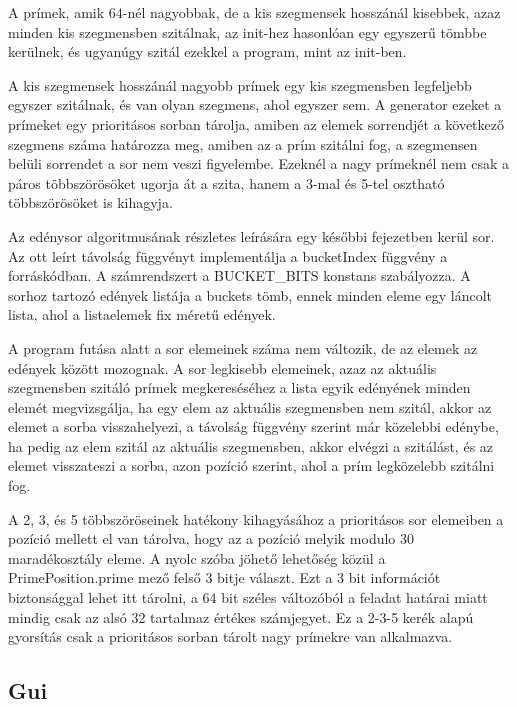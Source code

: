 A prímek, amik $64$-nél nagyobbak, de a kis szegmensek hosszánál kisebbek, azaz minden kis szegmensben szitálnak, az init-hez hasonlóan egy egyszerű tömbbe kerülnek, és ugyanúgy szitál ezekkel a program, mint az init-ben.

A kis szegmensek hosszánál nagyobb prímek egy kis szegmensben legfeljebb egyszer szitálnak, és van olyan szegmens, ahol egyszer sem.
A generator ezeket a prímeket egy prioritásos sorban tárolja, amiben az elemek sorrendjét a következő szegmens száma határozza meg, amiben az a prím szitálni fog, a szegmensen belüli sorrendet a sor nem veszi figyelembe.
Ezeknél a nagy prímeknél nem csak a páros többszörösöket ugorja át a szita, hanem a 3-mal és 5-tel osztható többszörösöket is kihagyja.

Az edénysor algoritmusának részletes leírására egy későbbi fejezetben kerül sor.
Az ott leírt távolság függvényt implementálja a bucketIndex függvény a forráskódban.
A számrendszert a BUCKET\_BITS konstans szabályozza.
A sorhoz tartozó edények listája a buckets tömb, ennek minden eleme egy láncolt lista, ahol a listaelemek fix méretű edények.

A program futása alatt a sor elemeinek száma nem változik, de az elemek az edények között mozognak.
A sor legkisebb elemeinek, azaz az aktuális szegmensben szitáló prímek megkereséséhez a lista egyik edényének minden elemét megvizsgálja, ha egy elem az aktuális szegmensben nem szitál, akkor az elemet a sorba visszahelyezi, a távolság függvény szerint már közelebbi edénybe, ha pedig az elem szitál az aktuális szegmensben, akkor elvégzi a szitálást, és az elemet visszateszi a sorba, azon pozíció szerint, ahol a prím legközelebb szitálni fog.

A 2, 3, és 5 többszöröseinek hatékony kihagyásához
a prioritásos sor elemeiben a pozíció mellett el van tárolva,
hogy az a pozíció melyik modulo 30 maradékosztály eleme.
A nyolc szóba jöhető lehetőség közül a PrimePosition.prime mező
felső 3 bitje választ. Ezt a 3 bit információt biztonsággal
lehet itt tárolni, a 64 bit széles változóból a feladat határai
miatt mindig csak az alsó 32 tartalmaz értékes számjegyet.
Ez a 2-3-5 kerék alapú gyorsítás csak a prioritásos sorban
tárolt nagy prímekre van alkalmazva.

\subsection{Gui}

